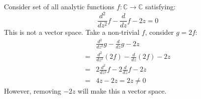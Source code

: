 \documentclass{article}
\begin{document}
\begin{example}\rm\nextline
	Consider set of all analytic functions $f:\mathbb{C}\xrightarrow{}\mathbb{C}$ satisfying:
	$$
		\frac{d^2}{dz^2}f-\frac{d}{dz}f-2z=0
	$$
	This is not a vector space. Take a non-trivial $f$, consider $g=2f$:
	\begin{equation}
		\begin{split}\nonumber
			&\frac{d^2}{dz^2}g-\frac{d}{dz}g-2z\\
			=&\frac{d^2}{dz^2}(2f)-\frac{d}{dz}(2f)-2z\\
			=&2\frac{d^2}{dz^2}f-2\frac{d}{dz}f-2z\\
			=&4z-2z=2z\neq0
		\end{split}
	\end{equation}
	However, removing $-2z$ will make this a vector space.
\end{example}
\end{document}
